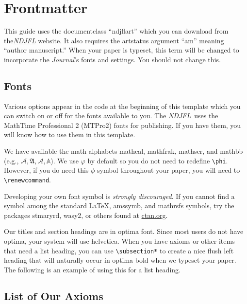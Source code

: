 \documentclass{ndjflart}
\theoremstyle{definition}
\theoremstyle{remark}
\newcommand{\NDJFL}{\emph{NDJFL}}
\newcommand{\Jo}{\emph{Journal}}
\newcommand{\origphi}{\phi}
\begin{document}
\section{Frontmatter}\label{front}
This guide uses the documentclass ``ndjflart'' which you can download
from the\linebreak \href{http://ndjfl.nd.edu}{\NDJFL} website.  It
also requires the artstatus argument ``am'' meaning ``author
manuscript.''  When your paper is typeset, this term will be changed
to incorporate the \Jo's fonts and settings.  You should not change
this.


\subsection{Fonts}\label{fonts} 
Various options appear in the code at the beginning of this template
which you can switch on or off for the fonts available to you.  The
\NDJFL\ uses the MathTime{\tiny\texttrademark} Professional 2
(MTPro2)%
%
%
fonts for publishing.  If you have them, you will know how to use them
in this template.

We have available the math alphabets mathcal, mathfrak, mathscr, and
mathbb (e.g., $\mathcal{A}, \mathfrak{A}, \mathscr{A}, \mathbb{A}$).
We use $\varphi$ by default so you do not need to redefine
\verb=\phi=.  However, if you do need this $\origphi$ symbol
throughout your paper, you will need to \verb=\renewcommand=.

Developing your own font symbol is \emph{strongly discouraged}.  If
you cannot find a symbol among the standard \LaTeX, amssymb, and
mathrsfs symbols, try the packages stmaryrd, wasy2, or others found at
\href{http://www.ctan.org}{ctan.org}.

Our titles and section headings are in optima font.  Since most users
do not have optima, your system will use helvetica.  When you have
axioms or other items that need a list heading, you can use
\verb=\subsection*= to create a nice flush left heading that will
naturally occur in optima bold when we typeset your paper.  The
following is an example of using this for a list heading.

\subsection*{List of Our Axioms}
\end{document}
